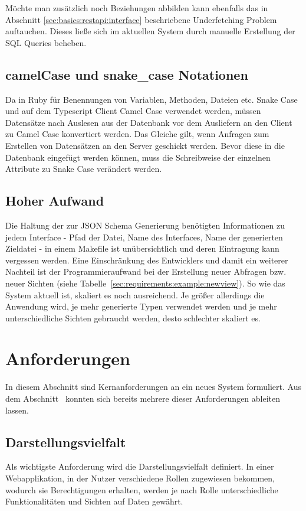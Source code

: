Möchte man zusätzlich noch Beziehungen abbilden kann ebenfalls das in Abschnitt \ref{sec:basics:restapi:interface} beschriebene Underfetching Problem auftauchen.
Dieses ließe sich im aktuellen System durch manuelle Erstellung der SQL Queries beheben.

\subsection{camelCase und snake\_case Notationen}
Da in Ruby für Benennungen von Variablen, Methoden, Dateien etc. Snake Case und auf dem Typescript Client Camel Case verwendet werden, müssen Datensätze nach Auslesen aus der Datenbank vor dem Ausliefern an den Client zu Camel Case konvertiert werden. Das Gleiche gilt, wenn Anfragen zum Erstellen von Datensätzen an den Server geschickt werden. Bevor diese in die Datenbank eingefügt werden können, muss die Schreibweise der einzelnen Attribute zu Snake Case verändert werden.

\subsection{Hoher Aufwand}
Die Haltung der zur JSON Schema Generierung benötigten Informationen zu jedem Interface - Pfad der Datei, Name des Interfaces, Name der generierten Zieldatei -
in einem Makefile ist unübersichtlich und deren Eintragung kann vergessen werden. 
Eine Einschränkung des Entwicklers und damit ein weiterer Nachteil ist der Programmieraufwand bei der Erstellung neuer Abfragen bzw. neuer Sichten (siehe Tabelle~\ref{sec:requirements:example:newview}).
So wie das System aktuell ist, skaliert es noch ausreichend. Je größer allerdings die Anwendung wird, je mehr generierte Typen verwendet werden und je mehr unterschiedliche Sichten gebraucht werden, desto schlechter skaliert es.

\section{Anforderungen}
\label{sec:requirements:req}
In diesem Abschnitt sind Kernanforderungen an ein neues System formuliert.
Aus dem Abschnitt~ konnten sich bereits mehrere dieser Anforderungen ableiten lassen.

\subsection{Darstellungsvielfalt}
\label{sec:requirements:req:view}
Als wichtigste Anforderung wird die Darstellungsvielfalt definiert.
In einer Webapplikation, in der Nutzer verschiedene Rollen zugewiesen bekommen, wodurch sie Berechtigungen erhalten,
werden je nach Rolle unterschiedliche Funktionalitäten und Sichten auf Daten gewährt.

